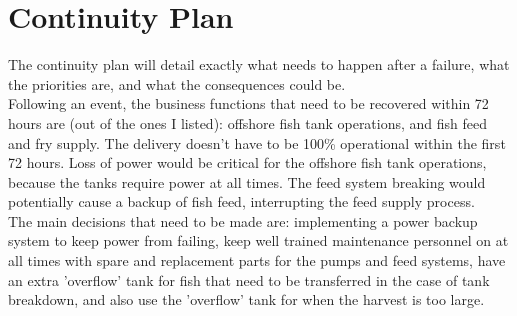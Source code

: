 \documentclass{article}
\numberwithin{equation}{section} %
\numberwithin{figure}{section} %
\numberwithin{table}{section} %
\begin{document}
\section{Continuity Plan}
The continuity plan will detail exactly what needs to happen after a failure, what the priorities are, and what the consequences could be. \\

Following an event, the business functions that need to be recovered within 72 hours are (out of the ones I listed): offshore fish tank operations, and fish feed and fry supply.  The delivery doesn't have to be 100\% operational within the first 72 hours.   Loss of power would be critical for the offshore fish tank operations, because the tanks require power at all times.  The feed system breaking would potentially cause a backup of fish feed, interrupting the feed supply process.  \\

The main decisions that need to be made are:  implementing a power backup system to keep power from failing, keep well trained maintenance personnel on at all times with spare and replacement parts for the pumps and feed systems, have an extra 'overflow' tank for fish that need to be transferred in the case of tank breakdown, and also use the 'overflow' tank for when the harvest is too large.
 
\end{document}
